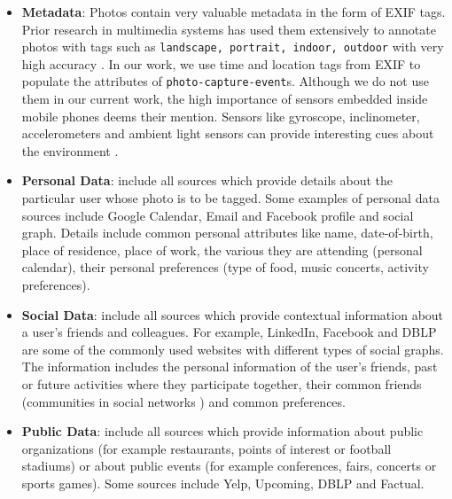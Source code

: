 \begin{itemize}
\item \textbf{Metadata}: Photos contain very valuable metadata in the form of EXIF tags. Prior research in multimedia systems has used them extensively to annotate photos with tags such as \texttt{landscape, portrait, indoor, outdoor} with very high accuracy \cite{boutell2004photo, sinha2008concept}. In our work, we use time and location tags from EXIF to populate the attributes of \texttt{photo-capture-event}s. Although we do not use them in our current work, the high importance of sensors embedded inside mobile phones deems their mention. Sensors like gyroscope, inclinometer, accelerometers and ambient light sensors can provide interesting cues about the environment \cite{patterson2005assisted, siewiorek2003sensay}.

\item \textbf{Personal Data}: include all sources which provide details about the particular user whose photo is to be tagged. Some examples of personal data sources include Google Calendar, Email and Facebook profile and social graph. Details include common personal attributes like name, date-of-birth, place of residence, place of work, the various they are attending (personal calendar), their personal preferences (type of food, music concerts, activity preferences).

\item \textbf{Social Data}: include all sources which provide contextual information about a user's friends and colleagues. For example, LinkedIn, Facebook and DBLP are some of the commonly used websites with different types of social graphs. The information includes the personal information of the user's friends, past or future activities where they participate together, their common friends (communities in social networks \cite{backstrom2006group, krawczyk2009communities}) and common preferences.

\item \textbf{Public Data}: include all sources which provide information about public organizations (for example restaurants, points of interest or football stadiums) or about public events (for example conferences, fairs, concerts or sports games). Some sources include Yelp, Upcoming, DBLP and Factual.
\end{itemize}

